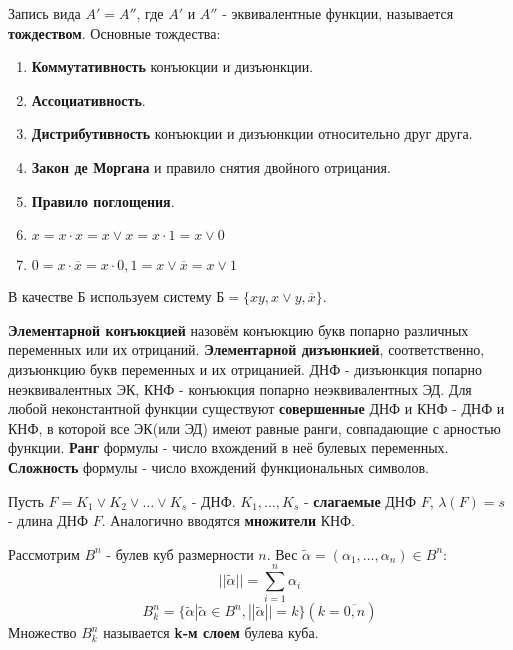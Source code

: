 \documentclass[11pt]{article}
\begin{document}
Запись вида \(A' = A''\), где \(A'\) и \(A''\) - эквивалентные функции, называется \textbf{тождеством}.
Основные тождества:
\begin{enumerate}
\item \textbf{Коммутативность} конъюкции и дизъюнкции.
\item \textbf{Ассоциативность}.
\item \textbf{Дистрибутивность} конъюкции и дизъюнкции относительно друг друга.
\item \textbf{Закон де Моргана} и правило снятия двойного отрицания.
\item \textbf{Правило поглощения}.
\item \(x = x\cdot x = x \vee x = x\cdot1 = x\vee 0\)
\item \(0 = x\cdot\overline{x} = x\cdot0, 1 = x\vee\overline{x} = x\vee1\)
\end{enumerate}
В качестве Б используем систему \(\text{Б} = \{xy, x\vee y, \overline{x}\}\).

\textbf{Элементарной конъюкцией} назовём конъюкцию букв попарно различных переменных или их отрицаний.
\textbf{Элементарной дизъюнкией}, соответственно, дизъюнкцию букв переменных и их отрицанией.
ДНФ - дизъюнкция попарно неэквивалентных ЭК, КНФ - конъюкция попарно неэквивалентных ЭД.
Для любой неконстантной функции существуют \textbf{совершенные} ДНФ и КНФ - ДНФ и КНФ, в которой все
ЭК(или ЭД) имеют равные ранги, совпадающие с арностью функции.
\textbf{Ранг} формулы - число вхождений в неё булевых переменных. \textbf{Сложность} формулы - число
вхождений функциональных символов.

Пусть \(F = K_1 \vee K_2 \vee \ldots \vee K_s\) - ДНФ. \(K_1, \ldots, K_s\) - \textbf{слагаемые} ДНФ \(F\),
\(\lambda(F) = s\) - длина ДНФ \(F\). Аналогично вводятся \textbf{множители} КНФ.

Рассмотрим \(B^n\) - булев куб размерности \(n\). Вес \(\tilde{\alpha} = (\alpha_1, \ldots, \alpha_n) \in B^n\):
\begin{equation*}
||\tilde{\alpha}|| = \sum_{i = 1}^n\alpha_i
\end{equation*}
\begin{equation*}
B_k^n = \{\tilde{\alpha} | \tilde{\alpha} \in B^n, ||\tilde{\alpha}|| = k\}(k = \overline{0, n})
\end{equation*}
Множество \(B_k^n\) называется \textbf{k-м слоем} булева куба.
\end{document}

